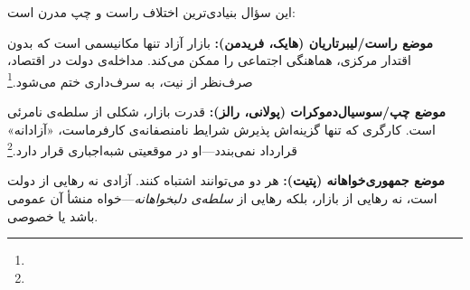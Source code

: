 \vspace{0.6cm}

\begin{tcolorbox}[title={کانون اصلی دعوا: آیا بازار آزاد، آزادی را گسترش می‌دهد یا محدود می‌کند؟},
  colback=AccentGold!8, colframe=AccentGold!60!black, fonttitle=\bfseries]

این سؤال بنیادی‌ترین اختلاف راست و چپ مدرن است:

\textbf{موضع راست/لیبرتاریان (هایک، فریدمن):} بازار آزاد تنها مکانیسمی است که بدون اقتدار مرکزی، هماهنگی اجتماعی را ممکن می‌کند. مداخله‌ی دولت در اقتصاد، صرف‌نظر از نیت، به سرف‌داری ختم می‌شود.\footnote{} %

\textbf{موضع چپ/سوسیال‌دموکرات (پولانی، رالز):} قدرت بازار، شکلی از سلطه‌ی نامرئی است. کارگری که تنها گزینه‌اش پذیرش شرایط نامنصفانه‌ی کارفرماست، «آزادانه» قرارداد نمی‌بندد—او در موقعیتی شبه‌اجباری قرار دارد.\footnote{} %

\textbf{موضع جمهوری‌خواهانه (پتیت):} هر دو می‌توانند اشتباه کنند. آزادی نه رهایی از دولت است، نه رهایی از بازار، بلکه رهایی از \textit{سلطه‌ی دلبخواهانه}—خواه منشأ آن عمومی باشد یا خصوصی.
\end{tcolorbox}

\vspace{0.5cm}

